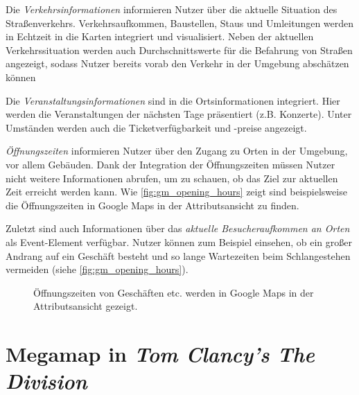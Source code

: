 Die \emph{Verkehrsinformationen} informieren Nutzer über die aktuelle Situation des Straßenverkehrs.
Verkehrsaufkommen, Baustellen, Staus und Umleitungen werden in Echtzeit in die Karten integriert und visualisiert.
Neben der aktuellen Verkehrssituation werden auch Durchschnittswerte für die Befahrung von Straßen angezeigt, sodass Nutzer bereits vorab den Verkehr in der Umgebung abschätzen können

Die \emph{Veranstaltungsinformationen} sind in die Ortsinformationen integriert.
Hier werden die Veranstaltungen der nächsten Tage präsentiert (z.B. Konzerte).
Unter Umständen werden auch die Ticketverfügbarkeit und -preise angezeigt.

\emph{Öffnungszeiten} informieren Nutzer über den Zugang zu Orten in der Umgebung, vor allem Gebäuden.
Dank der Integration der Öffnungszeiten müssen Nutzer nicht weitere Informationen abrufen, um zu schauen, ob das Ziel zur aktuellen Zeit erreicht werden kann.
Wie \autoref{fig:gm_opening_hours} zeigt sind beispielsweise die Öffnungszeiten in Google Maps in der Attributsansicht zu finden.

Zuletzt sind auch Informationen über das \emph{aktuelle Besucheraufkommen an Orten} als Event-Element verfügbar.
Nutzer können zum Beispiel einsehen, ob ein großer Andrang auf ein Geschäft besteht und so lange Wartezeiten beim Schlangestehen vermeiden (siehe \autoref{fig:gm_opening_hours}).
\begin{figure}[th]
	\centering
	\caption{Öffnungszeiten von Geschäften etc. werden in Google Maps in der Attributsansicht gezeigt.}
	\label{fig:gm_opening_hours}
\end{figure}

\section{Megamap in \emph{Tom Clancy's The Division}}

